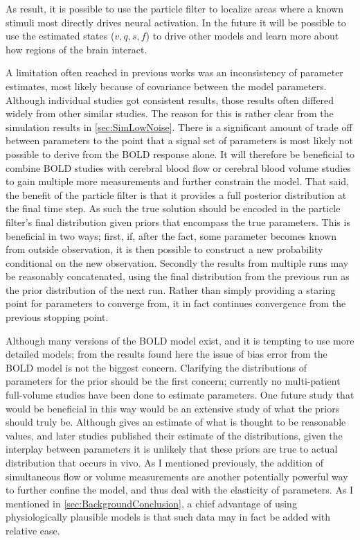 
As result, it is possible to use
the particle filter to localize areas where a known stimuli most directly drives
neural activation. In the future it will be possible to use the estimated states
($v,q,s,f$) to drive other models and learn more about how regions of the brain
interact. 

A limitation often reached in previous works was an inconsistency of
parameter estimates, most likely because of covariance between the model parameters.
Although individual studies got consistent results, those results often differed
widely from other similar studies. The reason for this is rather clear from the
simulation results in \autoref{sec:SimLowNoise}. There is a significant amount of
trade off between parameters to the point that a signal set of parameters
is most likely not possible to derive from the BOLD response alone. It
will therefore be beneficial to combine BOLD studies with cerebral blood
flow or cerebral blood volume studies to gain multiple more measurements and
further constrain the model. That said, the benefit of the particle filter
is that it provides a full posterior distribution at the final time step.
As such the true solution should be encoded in the particle filter's final 
distribution given priors that encompass the true parameters. This is beneficial
in two ways; first, if, after the fact, some parameter becomes known 
from outside observation, it is then possible to construct a new probability
conditional on the new observation. Secondly the results from multiple runs
may be reasonably concatenated, using the final distribution from the previous
run as the prior distribution of the next run. Rather than simply providing a 
staring point for parameters to converge from, it in fact continues convergence
from the previous stopping point. 

Although many versions of the BOLD model exist, and it is tempting to use 
more detailed models; from the results found here the issue of bias error
from the BOLD model is not the biggest concern. Clarifying the distributions
of parameters for the prior should be the first concern; currently no multi-patient
full-volume studies have been done to estimate parameters.
One future study that would be beneficial in this way  would
be an extensive study of what the priors should truly be. Although \cite{Friston2000}
gives an estimate of what is thought to be reasonable values, and later studies
published their estimate of the distributions, given the interplay between
parameters it is unlikely that these priors are true to actual distribution
that occurs in vivo. As I mentioned previously, the addition of simultaneous
flow or volume measurements are another potentially powerful way to further confine the model,
and thus deal with the elasticity of parameters. As I mentioned in 
\autoref{sec:BackgroundConclusion}, a chief advantage of using physiologically
plausible models is that such data may in fact be added with relative ease.


